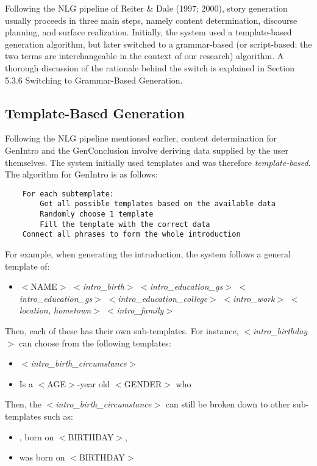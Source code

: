 Following the NLG pipeline of Reiter \& Dale (1997; 2000), story generation usually proceeds in three main steps, namely content determination, discourse planning, and surface realization. Initially, the system used a template-based generation algorithm, but later switched to a grammar-based (or script-based; the two terms are interchangeable in the context of our research) algorithm. A thorough discussion of the rationale behind the switch is explained in Section 5.3.6 Switching to Grammar-Based Generation.

\subsection{Template-Based Generation}
Following the NLG pipeline mentioned earlier, content determination for GenIntro and the GenConclusion involve deriving data supplied by the user themselves. The system initially used templates and was therefore \textit{template-based}. The algorithm for GenIntro is as follows:
\begin{lstlisting}
	For each subtemplate:
		Get all possible templates based on the available data
		Randomly choose 1 template
		Fill the template with the correct data
	Connect all phrases to form the whole introduction
\end{lstlisting}

For example, when generating the introduction, the system follows a general template of:
\begin{itemize}
	\item $<$NAME$>$ $<$\textit{intro\_birth}$>$  $<$\textit{intro\_education\_gs}$>$ $<$\textit{intro\_education\_gs}$>$ $<$\textit{intro\_education\_college}$>$ $<$\textit{intro\_work}$>$ $<$\textit{location, hometown}$>$ $<$\textit{intro_family}$>$
\end{itemize}

Then, each of these has their own sub-templates. For instance, $<$\textit{intro\_birthday}$>$ can choose from the following templates:
\begin{itemize}
	\item $<$\textit{intro\_birth\_circumstance}$>$
	\item Is a $<$AGE$>$-year old $<$GENDER$>$ who
\end{itemize}

Then, the $<$\textit{intro\_birth\_circumstance}$>$ can still be broken down to other sub-templates such as:
\begin{itemize}
	\item , born on $<$BIRTHDAY$>$,
	\item was born on $<$BIRTHDAY$>$
\end{itemize}

